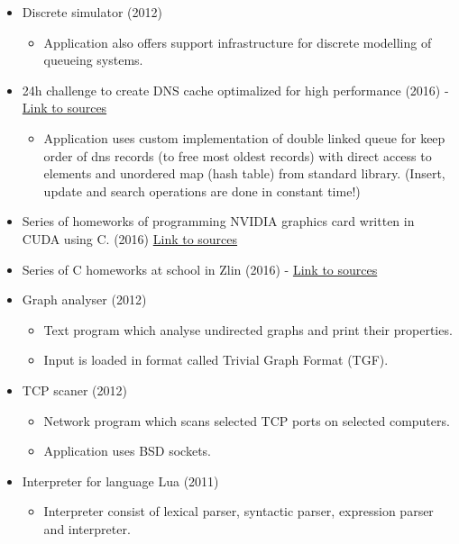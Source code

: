 \documentclass[11pt,a4paper,sans]{moderncv}        %
\begin{document}
{
\begin{itemize}
	\item Discrete simulator (2012)
	\begin{itemize}
		\item Application also offers support infrastructure for discrete modelling of queueing systems.
	\end{itemize}
	\item 24h challenge to create DNS cache optimalized for high performance (2016) - \href{https://github.com/navrkald/DNSCache}{Link to sources}
	\begin{itemize}
		\item Application uses custom implementation of double linked queue for keep order of dns records (to free most oldest records) with direct access to elements and unordered map (hash table) from standard library. (Insert, update and search operations are done in constant time!)
	\end{itemize}
\end{itemize}
}
{
	\begin{itemize}
		\item Series of homeworks of programming NVIDIA graphics card written in CUDA using C. (2016) \href{https://github.com/navrkald/Zlin_NVIDIA_programming_homeworks}{Link to sources}
		\item Series of C homeworks at school in Zlin (2016) - \href{https://github.com/navrkald/Zlin-C-programming-homeworks}{Link to sources} 
		\item Graph analyser (2012)
		\begin{itemize}
			\item Text program which analyse undirected graphs and print their properties.
			\item Input is loaded in format called Trivial Graph Format (TGF).
		\end{itemize}
		\item TCP scaner (2012)
		\begin{itemize}
			\item Network program which scans selected TCP ports on selected computers.
			\item Application uses BSD sockets.
		\end{itemize}	
		\item Interpreter for language Lua (2011)
		\begin{itemize}
			\item Interpreter consist of lexical parser, syntactic parser, expression parser and interpreter.
		\end{itemize}
	\end{itemize}
}
\end{document}
